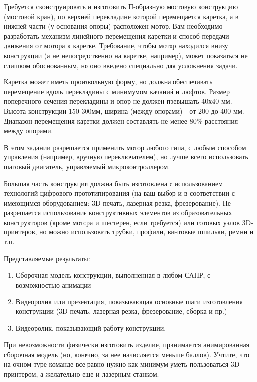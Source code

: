 

Требуется сконструировать и изготовить П-образную мостовую конструкцию (мостовой кран), 
по верхней перекладине которой перемещается каретка, а в нижней части (у основания опоры) 
расположен мотор. Вам необходимо разработать механизм линейного перемещения каретки и способ 
передачи движения от мотора к каретке. Требование, чтобы мотор находился внизу конструкции 
(а не непосредственно на каретке, например), может показаться не слишком обоснованным, 
но оно введено специально для усложнения задачи.

Каретка может иметь произвольную форму, но должна обеспечивать перемещение вдоль 
перекладины с минимумом качаний и люфтов. Размер поперечного сечения перекладины и 
опор не должен превышать 40х40 мм. Высота конструкции 150-300мм, ширина (между опорами) - 
от 200 до 400 мм. Диапазон перемещения каретки должен составлять не менее $80\%$ расстояния между опорами.

В этом задании разрешается применить мотор любого типа, с любым способом управления 
(например, вручную переключателем), но лучше всего использовать шаговый двигатель, управляемый 
микроконтроллером.

Большая часть конструкции должна быть изготовлена с 
использованием технологий цифрового прототипирования (на ваш выбор и в соответствии 
с имеющимся оборудованием: 3D-печать, лазерная резка, фрезерование). Не разрешается использование 
конструктивных элементов из образовательных конструкторов (кроме мотора и шестерен, если требуется) или готовых узлов 3D-принтеров, но можно использовать трубки, профили, винтовые шпильки, ремни и т.п.  

Представляемые результаты:

\begin{enumerate}
    \item Сборочная модель конструкции, выполненная в любом САПР, с возможностью анимации
    \item Видеоролик или презентация, показывающая основные шаги изготовления конструкции (3D-печать, лазерная резка, фрезерование, сборка и пр.)
    \item Видеоролик, показывающий работу конструкции.
\end{enumerate}

При невозможности физически изготовить изделие, принимается анимированная сборочная модель 
(но, конечно, за нее начисляется меньше баллов). Учтите, что на очном туре команде все равно 
нужно как минимум уметь пользоваться 3D-принтером, а желательно еще и лазерным станком.